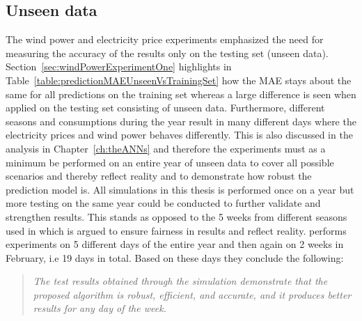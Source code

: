 \subsection{Unseen data}
\label{sec:unseenDataDiscussion}
The wind power and electricity price experiments emphasized the need for measuring the accuracy of the results only on the testing set (unseen data). Section~\ref{sec:windPowerExperimentOne} highlights in Table~\ref{table:predictionMAEUnseenVsTrainingSet} how the MAE stays about the same for all predictions on the training set whereas a large difference is seen when applied on the testing set consisting of unseen data. Furthermore, different seasons and consumptions during the year result in many different days where the electricity prices and wind power behaves differently. This is also discussed in the analysis in Chapter~\ref{ch:theANNs} and therefore the experiments must as a minimum be performed on an entire year of unseen data to cover all possible scenarios and thereby reflect reality and to demonstrate how robust the prediction model is. All simulations in this thesis is performed once on a year but more testing on the same year could be conducted to further validate and strengthen results. This stands as opposed to the 5 weeks from different seasons used in \cite{1} which is argued to ensure fairness in results and reflect reality. \cite{pjmForecast} performs experiments on 5 different days of the entire year and then again on 2 weeks in February, i.e 19 days in total. Based on these days they conclude the following:

\begin{quotation}
\textit{The test results obtained through the simulation demonstrate that the proposed algorithm is robust, efficient, and accurate, and it produces better results for any day of the week.}
\end{quotation}

